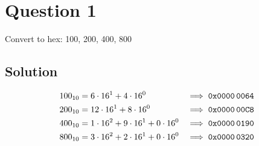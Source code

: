 \section*{Question 1}

Convert to hex: 100, 200, 400, 800

\subsection*{Solution}

\begin{align*}
    100_{10} & = 6 \cdot 16^1 + 4 \cdot 16^0                & \implies \texttt{0x0000\,0064} \\
    200_{10} & = 12 \cdot 16^1 + 8 \cdot 16^0               & \implies \texttt{0x0000\,00C8} \\
    400_{10} & = 1 \cdot 16^2 + 9 \cdot 16^1 + 0 \cdot 16^0 & \implies \texttt{0x0000\,0190} \\
    800_{10} & = 3 \cdot 16^2 + 2 \cdot 16^1 + 0 \cdot 16^0 & \implies \texttt{0x0000\,0320}
\end{align*}
